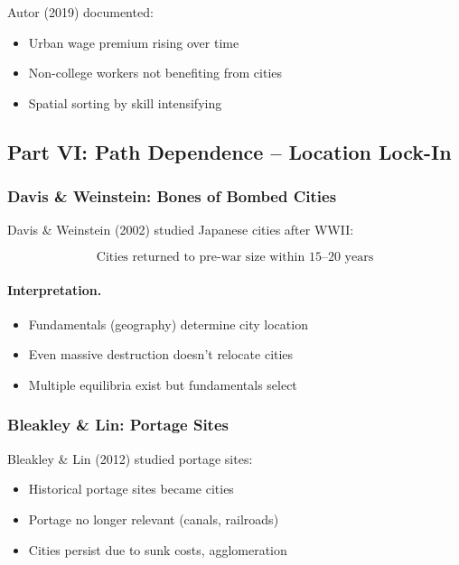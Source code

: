 Autor (2019) documented:
\begin{itemize}
    \item Urban wage premium rising over time
    \item Non-college workers not benefiting from cities
    \item Spatial sorting by skill intensifying
\end{itemize}

\subsection{Part VI: Path Dependence – Location Lock-In}

\subsubsection{Davis \& Weinstein: Bones of Bombed Cities}

Davis \& Weinstein (2002) studied Japanese cities after WWII:

\begin{equation}
\boxed{
\text{Cities returned to pre-war size within 15--20 years}
}
\label{eq:davis-weinstein}
\end{equation}

\paragraph{Interpretation.}
\begin{itemize}
    \item Fundamentals (geography) determine city location
    \item Even massive destruction doesn't relocate cities
    \item Multiple equilibria exist but fundamentals select
\end{itemize}

\subsubsection{Bleakley \& Lin: Portage Sites}

Bleakley \& Lin (2012) studied portage sites:
\begin{itemize}
    \item Historical portage sites became cities
    \item Portage no longer relevant (canals, railroads)
    \item Cities persist due to sunk costs, agglomeration
\end{itemize}

